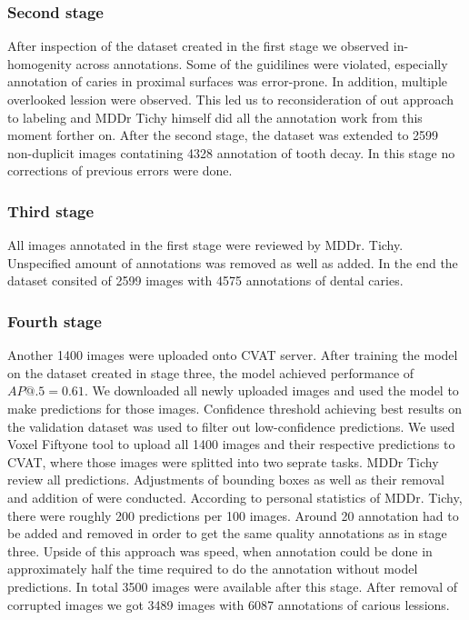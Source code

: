 \subsubsection{Second stage}
After inspection of the dataset created in the first stage we observed in-homogenity across annotations. Some of the guidilines were violated, especially annotation of caries in proximal surfaces was error-prone. In addition, multiple overlooked lession were observed. This led us to reconsideration of out approach to labeling and MDDr Tichy himself did all the annotation work from this moment forther on. After the second stage, the dataset was extended to 2599 non-duplicit images contatining 4328 annotation of tooth decay. In this stage no corrections of previous errors were done.

\subsubsection{Third stage}
All images annotated in the first stage were reviewed by MDDr. Tichy. Unspecified amount of annotations was removed as well as added. In the end the dataset consited of 2599 images with 4575 annotations of dental caries.

\subsubsection{Fourth stage}
Another 1400 images were uploaded onto CVAT server. After training the model on the dataset created in stage three, the model achieved performance of $AP@.5=0.61$. We downloaded all newly uploaded images and used the model to make predictions for those images. Confidence threshold achieving best results on the validation dataset was used to filter out low-confidence predictions. We used Voxel Fiftyone tool to upload all 1400 images and their respective predictions to CVAT, where those images were splitted into two seprate tasks.
MDDr Tichy review all predictions. Adjustments of bounding boxes as well as their removal and addition of were conducted. According to personal statistics of MDDr. Tichy, there were roughly 200 predictions per 100 images. Around 20 annotation had to be added and removed in order to get the same quality annotations as in stage three. Upside of this approach was speed, when annotation could be done in approximately half the time required to do the annotation without model predictions. In total 3500 images were available after this stage. After removal of corrupted images we got 3489 images with 6087 annotations of carious lessions.

